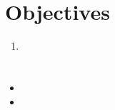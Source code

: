 \documentclass{article}
\begin{document}
	
	\title{}
	\author{Nico Limacher}
	
\maketitle
\section{Objectives}

\begin{enumerate}
	\itemsep0em
	\item 
\end{enumerate}

\section{}

\section{}
\begin{itemize}
	\itemsep0em
	\item
	\item
\end{itemize}
\end{document}
